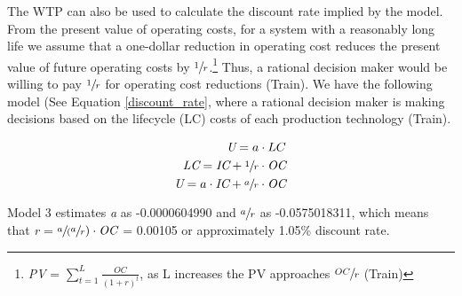 \documentclass[10pt]{amsart}
\begin{document}
The WTP can also be used to calculate the discount rate implied by the model.
From the present value of operating costs, for a system with a reasonably long life we assume that a one-dollar reduction in operating cost reduces the present value of future operating costs by $\sfrac{1}{r}$.\footnote{\textit{PV} = $\sum_{t=1}^L \frac{OC}{(1+r)^t}$, as L increases the PV approaches $\sfrac{OC}{r}$ \parencite{}(Train)}
Thus, a rational decision maker would be willing to pay $\sfrac{1}{r}$ for operating cost reductions \parencite{}(Train). 
We have the following model (See Equation \ref{discount_rate}, where a rational decision maker is making decisions based on the lifecycle (LC) costs of each production technology \parencite{}(Train).

\begin{equation}\label{discount_rate}
\begin{split}
\textit{U} = a\cdot LC \\
\textit{LC} = \textit{IC} + \sfrac{1}{r}\cdot\textit{OC} \\
\textit{U} = a\cdot\textit{IC} + \sfrac{a}{r}\cdot\textit{OC}
\end{split}
\end{equation}

Model 3 estimates \textit{a} as -0.0000604990 and $\sfrac{a}{r}$ as -0.0575018311, which means that \textit{r} = $\sfrac{a}({\sfrac{a}{r}})\cdot\textit{OC}$ = 0.00105 or approximately 1.05\% discount rate.
\end{document}
